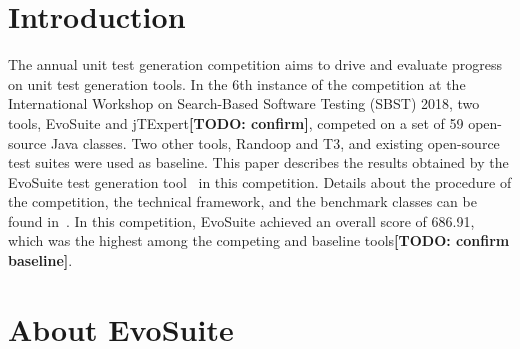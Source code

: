 \documentclass[sigconf,table]{acmart}
\newcommand{\TODO}[1]{\textbf{\textcolor{ScarletRed}{[TODO: #1]}}\xspace}
\newcommand{\TODO}[1]{}
\newcommand{\EVOSUITE}{{\sc EvoSuite}\xspace}
\newcommand{\JTEXPERT}{{\sc jTExpert}\xspace}
\newcommand{\RANDOOP}{{\sc Randoop}\xspace}
\newcommand{\TT}{{\sc T3}\xspace}
\newcommand{\TOTALPOINTS}{{686.91}\xspace}
\begin{document}
\section{Introduction}
The annual unit test generation competition aims to drive and evaluate
progress on unit test generation tools. In the 6th instance of the
competition at the International Workshop on Search-Based Software
Testing (SBST) 2018, two tools, \EVOSUITE and \JTEXPERT\TODO{confirm},
competed on a set of 59 open-source Java classes. Two other tools,
\RANDOOP and \TT, and existing open-source test suites were used as
baseline. This paper describes the results obtained by the \EVOSUITE
test generation tool~\cite{FrA11c} in this competition. Details about
the procedure of the competition, the technical framework, and the
benchmark classes can be found in~\cite{sbst18competition}.  In this
competition, \EVOSUITE achieved an overall score of \TOTALPOINTS,
which was the highest among the competing and baseline
tools\TODO{confirm baseline}.

\section{About EvoSuite}
\end{document}

